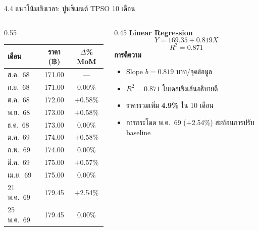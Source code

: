 \documentclass[aspectratio=169,11pt]{beamer}
\begin{document}
\begin{frame}{4.4 แนวโน้มเชิงเวลา: ปูนซีเมนต์ TPSO 10 เดือน}
  \footnotesize
  \begin{columns}[T,onlytextwidth]
    \begin{column}{0.55\textwidth}
      \begin{table}
        \centering
        \scriptsize
        \begin{tabular}{lcc}
          \toprule
          \textbf{เดือน} & \textbf{ราคา (฿)} & \textbf{$\Delta$\% MoM} \\
          \midrule
          ส.ค.~68         & 171.00 & --- \\
          ก.ย.~68         & 171.00 & 0.00\% \\
          ต.ค.~68         & 172.00 & $+$0.58\% \\
          พ.ย.~68         & 173.00 & $+$0.58\% \\
          ธ.ค.~68         & 173.00 & 0.00\% \\
          ม.ค.~69         & 174.00 & $+$0.58\% \\
          ก.พ.~69         & 174.00 & 0.00\% \\
          มี.ค.~69        & 175.00 & $+$0.57\% \\
          เม.ย.~69        & 175.00 & 0.00\% \\
          21 พ.ค.~69      & 179.45 & $+$2.54\% \\
          25 พ.ค.~69      & 179.45 & 0.00\% \\
          \bottomrule
        \end{tabular}
      \end{table}
    \end{column}
    \begin{column}{0.45\textwidth}
      \textbf{Linear Regression}
      \[
        Y = 169.35 + 0.819 X
      \]
      \[
        R^2 = 0.871
      \]
      \textbf{การตีความ}
      \begin{itemize}
        \item Slope $b = 0.819$ บาท/จุดข้อมูล
        \item $R^2 = 0.871$ โมเดลเชิงเส้นอธิบายดี
        \item ราคารวมเพิ่ม \textbf{4.9\%} ใน 10 เดือน
        \item การกระโดด พ.ค.~69 ($+$2.54\%) สะท้อนการปรับ baseline
      \end{itemize}
    \end{column}
  \end{columns}
\end{frame}
\end{document}
